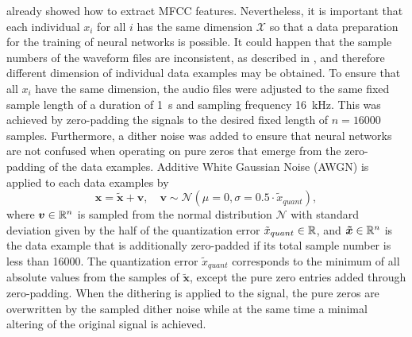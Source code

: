  already showed how to extract MFCC features.
Nevertheless, it is important that each individual $x_i$ for all $i$ has the same dimension $\mathcal{X}$ so that a data preparation for the training of neural networks is possible.
It could happen that the sample numbers of the waveform files are inconsistent, as described in , and therefore different dimension of individual data examples may be obtained.
To ensure that all $x_i$ have the same dimension, the audio files were adjusted to the same fixed sample length of a duration of \SI{1}{\second} and sampling frequency \SI{16}{\kilo\hertz}.
This was achieved by zero-padding the signals to the desired fixed length of $n = 16000$ samples.
Furthermore, a dither noise was added to ensure that neural networks are not confused when operating on pure zeros that emerge from the zero-padding of the data examples.
Additive White Gaussian Noise (AWGN) is applied to each data examples by
\begin{equation}\label{eq:exp_dither}
  \bm{x} = \bm{\tilde{x}} + \bm{v}, \quad \bm{v} \sim \mathcal{N}(\mu=0, \sigma=0.5 \cdot \tilde{x}_{quant}),
\end{equation}
where $\bm{v} \in \mathbb{R}^n$ is sampled from the normal distribution $\mathcal{N}$ with standard deviation given by the half of the quantization error $\tilde{x}_{quant} \in \mathbb{R}$, and $\bm{\tilde{x}} \in \mathbb{R}^n$ is the data example that is additionally zero-padded if its total sample number is less than 16000.
The quantization error $\tilde{x}_{quant}$ corresponds to the minimum of all absolute values from the samples of $\bm{\tilde{x}}$, except the pure zero entries added through zero-padding.
When the dithering is applied to the signal, the pure zeros are overwritten by the sampled dither noise while at the same time a minimal altering of the original signal is achieved.